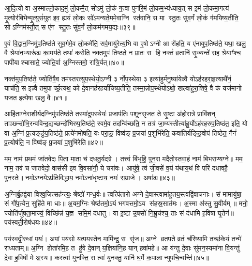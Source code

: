 आ॒दि॒त्यो वा अ॒स्माल्लो॒काद॒मुं लो॒कमै॒त् सो॑ऽमुं लो॒कं ग॒त्वा पुन॑रि॒मं लो॒कम॒भ्य॑ध्याय॒त् स इ॒मं लो॒कमा॒गत्य॑ मृ॒त्योर॑बिभेन्मृ॒त्युसं॑युत इव॒ ह्य॑यं लो॒कः सो॑ऽमन्यते॒ममे॒वाग्नि स्त॑वानि॒ स मा स्तु॒तः सु॑व॒र्गं लो॒कं ग॑मयिष्य॒तीति॒ सोऽग्निम॑स्तौ॒त् स ए॑न स्तु॒तः सु॑व॒र्गं लो॒कम॑गमय॒द्यः॥३९॥

ए॒वं वि॒द्वान॒ग्निमु॑प॒तिष्ठ॑ते सुव॒र्गमे॒व लो॒कमे॑ति॒ सर्व॒मायु॑रेत्य॒भि वा ए॒षोऽग्नी आ रो॑हति॒ य ए॑नावुप॒तिष्ठ॑ते॒ यथा॒ खलु॒ वै श्रेया॑न॒भ्यारू॑ढः का॒मय॑ते॒ तथा॑ करोति॒ नक्त॒मुप॑ तिष्ठते॒ न प्रा॒तः स हि नक्तं॑ व्र॒तानि॑ सृ॒ज्यन्ते॑ स॒ह श्रेयाꣳ॑श्च॒ पापी॑याश्चासाते॒ ज्योति॒र्वा अ॒ग्निस्तमो॒ रात्रि॒र्यत्॥४०॥

नक्त॑मुप॒तिष्ठ॑ते॒ ज्योति॑षै॒व तम॑स्तरत्युप॒स्थेयो॒ऽग्नी ३ र्नोप॒स्थेया ३ इत्या॑हुर्मनु॒ष्या॑येन्न्वै योऽह॑रहरा॒हृत्याथै॑नं॒ याच॑ति॒ स इन्न्वै तमुपार्च्छ॒त्यथ॒ को दे॒वानह॑रहर्याचिष्य॒तीति॒ तस्मा॒न्नोप॒स्थेयोऽथो॒ खल्वा॑हुरा॒शिषे॒ वै कं यज॑मानो यजत॒ इत्ये॒षा खलु॒ वै॥४१॥

आहि॑ताग्नेरा॒शीर्यद॒ग्निमु॑प॒तिष्ठ॑ते॒ तस्मा॑दुप॒स्थेयः॑ प्र॒जाप॑तिः प॒शून॑सृजत॒ ते सृ॒ष्टा अ॑होरा॒त्रे प्रावि॑श॒न् ताञ्छन्दो॑भि॒रन्व॑विन्द॒द्यच्छन्दो॑भिरुप॒तिष्ठ॑ते॒ स्वमे॒व तदन्वि॑च्छति॒ न तत्र॑ जा॒म्य॑स्तीत्या॑हु॒र्योऽह॑रहरुप॒तिष्ठ॑त॒ इति॒ यो वा अ॒ग्निं प्र॒त्यङ्ङु॑प॒तिष्ठ॑ते॒ प्रत्ये॑नमोषति॒ यः परा॒ङ्॒ विष्व॑ङ् प्र॒जया॑ प॒शुभि॑रेति॒ कवा॑तिर्यङ्ङि॒वोप॑ तिष्ठेत॒ नैनं॑ प्र॒त्योष॑ति॒ न विष्व॑ङ् प्र॒जया॑ प॒शुभि॑रेति॥४२॥

{\anuvakamend[{सि॒क्तस्य॑ स॒ह भ॑वति॒ यो यत्खलु॒ वै प॒शुभि॒स्त्रयो॑दश च॥९॥}]}

मम॒ नाम॑ प्रथ॒मं जा॑तवेदः पि॒ता मा॒ता च॑ दधतु॒र्यदग्रे। तत्त्वं बि॑भृहि॒ पुन॒रा मदैतो॒स्तवा॒हं नाम॑ बिभराण्यग्ने॥ मम॒ नाम॒ तव॑ च जातवेदो॒ वास॑सी इव वि॒वसा॑नौ॒ ये चरा॑वः। आयु॑षे॒ त्वं जी॒वसे॑ व॒यं य॑थाय॒थं वि परि॑ दधावहै॒ पुन॒स्ते॥ नमो॒ऽग्नयेऽप्र॑तिविद्धाय॒ नमोऽना॑धृष्टाय॒ नमः॑ स॒म्राजे। अषा॑ढः॥४३॥

अ॒ग्निर्बृ॒हद्व॑या विश्व॒जित्सह॑न्त्यः॒ श्रेष्ठो॑ गन्ध॒र्वः॥ त्वत्पि॑तारो अग्ने दे॒वास्त्वामा॑हुतय॒स्त्वद्वि॑वाचनाः। सं मामायु॑षा॒ सं गौ॑प॒त्येन॒ सुहि॑ते मा धाः॥ अ॒यम॒ग्निः श्रेष्ठ॑तमो॒ऽयं भग॑वत्तमो॒ऽय स॑हस्र॒सात॑मः। अ॒स्मा अ॑स्तु सु॒वीर्यम्॥ मनो॒ ज्योति॑र्जुषता॒माज्यं॒ विच्छि॑न्नं य॒ज्ञ समि॒मं द॑धातु। या इ॒ष्टा उ॒षसो॑ नि॒म्रुच॑श्च॒ ताः सं द॑धामि ह॒विषा॑ घृ॒तेन॑॥ पय॑स्वती॒रोष॑धयः॥४४॥

पय॑स्वद्वी॒रुधां॒ पयः॑। अ॒पां पय॑सो॒ यत्पय॒स्तेन॒ मामि॑न्द्र॒ स सृ॑ज॥ अग्ने व्रतपते व्र॒तं च॑रिष्यामि॒ तच्छ॑केयं॒ तन्मे॑ राध्यताम्॥ अ॒ग्नि होता॑रमि॒ह त हु॑वे दे॒वान् य॒ज्ञिया॑नि॒ह यान् हवा॑महे॥ आ य॑न्तु दे॒वाः सु॑मन॒स्यमा॑ना वि॒यन्तु॑ दे॒वा ह॒विषो॑ मे अ॒स्य॥ कस्त्वा॑ युनक्ति॒ स त्वा॑ युनक्तु॒ यानि॑ घ॒र्मे क॒पालान्युपचि॒न्वन्ति॑॥४५॥

